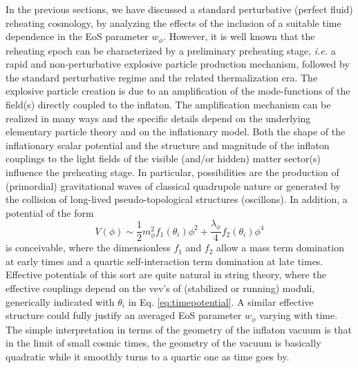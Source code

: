 \documentclass[%
aps,prd,nofootinbib,showkeys,a4paper,10pt
]{revtex4-2}
\begin{document}
In the previous sections, we have discussed a standard perturbative (perfect fluid) reheating cosmology,
by analyzing the effects of the inclusion of a suitable time dependence in the EoS parameter $w_{\phi}$.
However, it is well known that the reheating epoch can be characterized by a preliminary preheating stage, 
{\it i.e.} a rapid and non-perturbative explosive particle production mechanism, 
followed by the standard perturbative regime and the related thermalization era.
The explosive particle creation is due to an amplification of the mode-functions of the field(s) directly coupled to the inflaton.
The amplification mechanism can be realized in many ways
and the specific details depend on 
the underlying elementary particle theory and on the inflationary model.  
Both the shape of the inflationary scalar potential and 
the structure and magnitude of the inflaton couplings to the light fields of the visible (and/or hidden) matter sector(s) influence the preheating stage.  
In particular, possibilities are the production of (primordial) gravitational waves of classical quadrupole nature
or generated by the collision of long-lived pseudo-topological structures (oscillons).  
In addition, a potential of the form  
\begin{equation}
V(\phi)\sim \frac{1}{2}m^2_{\phi}f_1(\theta_i)\phi^2 + \frac{\lambda_{\phi}}{4}f_2(\theta_i)\phi^4 
\label{eq:timepotential}\end{equation}
is conceivable, where the dimensionless $f_1$ and $f_2$ allow a mass term domination at early times and a quartic self-interaction term domination at late times.  
Effective potentials of this sort are quite natural in string theory, where the effective couplings depend on the vev's of (stabilized or running) moduli, 
generically indicated with $\theta_i$ in Eq. \eqref{eq:timepotential}. 
A similar effective structure could fully justify an averaged EoS parameter $w_{\phi}$ varying with time.  
The simple interpretation in terms of the geometry of the inflaton vacuum is that 
in the limit of small cosmic times, the geometry of the vacuum is basically quadratic while it smoothly turns to a quartic one as time goes by.
\end{document}
